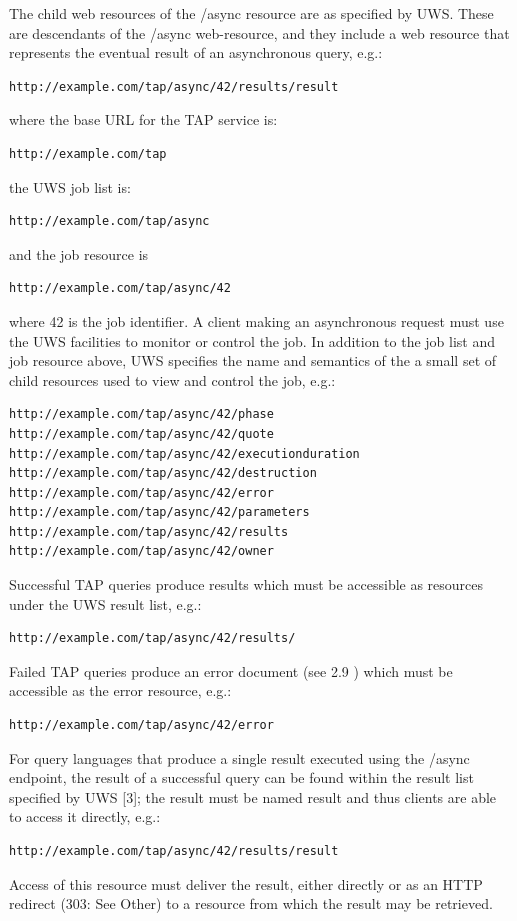 \documentclass[11pt,a4paper]{ivoa}
\begin{document}
The child web resources of the /async resource are as specified by UWS. These 
are descendants of the /async web-resource, and they include a web resource that 
represents the eventual result of an asynchronous query, e.g.:
\begin{verbatim}
http://example.com/tap/async/42/results/result
\end{verbatim}
where the base URL for the TAP service is:
\begin{verbatim}
http://example.com/tap
\end{verbatim}
the UWS job list is:
\begin{verbatim}
http://example.com/tap/async
\end{verbatim}
and the job resource is
\begin{verbatim}
http://example.com/tap/async/42
\end{verbatim}
where 42 is the job identifier. A client making an asynchronous request must use 
the UWS facilities to monitor or control the job. In addition to the job list 
and job resource above, UWS specifies the name and semantics of the a small set 
of child resources used to view and control the job, e.g.:
\begin{verbatim}
http://example.com/tap/async/42/phase
http://example.com/tap/async/42/quote
http://example.com/tap/async/42/executionduration
http://example.com/tap/async/42/destruction
http://example.com/tap/async/42/error
http://example.com/tap/async/42/parameters
http://example.com/tap/async/42/results
http://example.com/tap/async/42/owner
\end{verbatim}
Successful TAP queries produce results which must be accessible as  resources 
under the UWS result list, e.g.:
\begin{verbatim}
http://example.com/tap/async/42/results/
\end{verbatim}
Failed TAP queries produce an error document (see 2.9 ) which must be accessible 
as the error resource, e.g.:
\begin{verbatim}
http://example.com/tap/async/42/error
\end{verbatim}
For query languages that produce a single result executed using the /async 
endpoint, the result of a successful query can be found within the result list 
specified by UWS [3]; the result must be named result and thus clients are able 
to access it directly, e.g.:
\begin{verbatim}
http://example.com/tap/async/42/results/result
\end{verbatim}
Access of this resource must deliver the result, either directly or as an HTTP 
redirect (303: See Other) to a resource from which the result may be retrieved.
\end{document}
